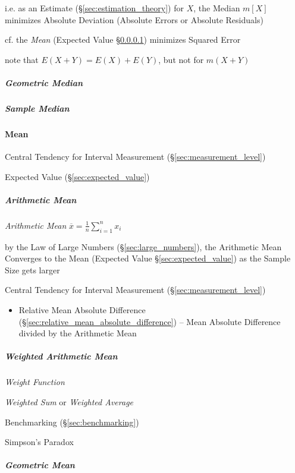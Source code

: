 i.e. as an Estimate (\S\ref{sec:estimation_theory}) for $X$, the Median $m[X]$
minimizes Absolute Deviation (Absolute Errors or Absolute Residuals)

cf. the \emph{Mean} (Expected Value \S\ref{sec:mean}) minimizes Squared Error

note that $E(X + Y) = E(X) + E(Y)$, but not for $m(X+Y)$



\subparagraph{Geometric Median}\label{sec:geometric_median}\hfill

\subparagraph{Sample Median}\label{sec:sample_median}\hfill



\paragraph{Mean}\label{sec:mean}\hfill

Central Tendency for Interval Measurement (\S\ref{sec:measurement_level})

\fist Expected Value (\S\ref{sec:expected_value})



\subparagraph{Arithmetic Mean}\label{sec:arithmetic_mean}\hfill

\emph{Arithmetic Mean} $\overline{x} = \frac{1}{n}\sum_{i=1}^n x_i$

by the Law of Large Numbers (\S\ref{sec:large_numbers}), the Arithmetic Mean
Converges to the Mean (Expected Value \S\ref{sec:expected_value}) as the Sample
Size gets larger

Central Tendency for Interval Measurement (\S\ref{sec:measurement_level})

\begin{itemize}
  \item Relative Mean Absolute Difference
    (\S\ref{sec:relative_mean_absolute_difference}) -- Mean Absolute Difference
    divided by the Arithmetic Mean
\end{itemize}



\subparagraph{Weighted Arithmetic Mean}\label{sec:weighted_mean}\hfill

\emph{Weight Function}

\emph{Weighted Sum} or \emph{Weighted Average}

\fist Benchmarking (\S\ref{sec:benchmarking})

Simpson's Paradox



\subparagraph{Geometric Mean}\label{sec:geometric_mean}\hfill

